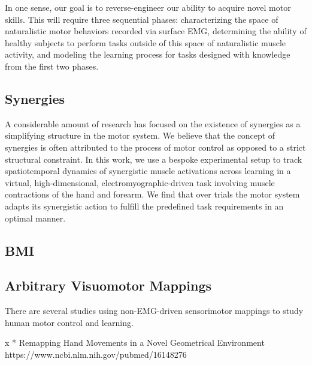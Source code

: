 {            In one sense, our goal is to reverse-engineer our ability to
            acquire novel motor skills. This will require three
            sequential phases: characterizing the space of naturalistic
            motor behaviors recorded via surface EMG, determining the
            ability of healthy subjects to perform tasks outside of this
            space of naturalistic muscle activity, and modeling the
            learning process for tasks designed with knowledge from the
            first two phases.

            \hypertarget{synergies}{%
            \subsection{Synergies}\label{synergies}}

            A considerable amount of research has focused on the
            existence of synergies as a simplifying structure in the
            motor system. We believe that the concept of synergies is
            often attributed to the process of motor control as opposed
            to a strict structural constraint. In this work, we use a
            bespoke experimental setup to track spatiotemporal dynamics
            of synergistic muscle activations across learning in a
            virtual, high-dimensional, electromyographic-driven task
            involving muscle contractions of the hand and forearm. We
            find that over trials the motor system adapts its
            synergistic action to fulfill the predefined task
            requirements in an optimal manner.

            \hypertarget{bmi}{%
            \subsection{BMI}\label{bmi}}

            \hypertarget{arbitrary-visuomotor-mappings}{%
            \subsection{Arbitrary Visuomotor
            Mappings}\label{arbitrary-visuomotor-mappings}}

            There are several studies using non-EMG-driven sensorimotor
            mappings to study human motor control and learning.

            x * Remapping Hand Movements in a Novel Geometrical
            Environment https://www.ncbi.nlm.nih.gov/pubmed/16148276

}
